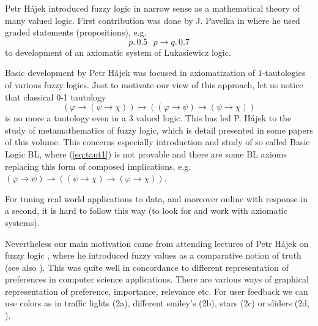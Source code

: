      Petr H\'{a}jek introduced fuzzy logic in narrow sense as a mathematical theory of many valued logic. First contribution was done by J. Pavelka in \cite{P} where he used graded statements (propositions), e.g.
\begin{displaymath}
p.\, 0.5\ \ \ p \rightarrow q.\, 0.7
\end{displaymath}
to development of an axiomatic system of Lukasiewicz logic. 
     
     Basic development by Petr H\'{a}jek \cite{Ha} was focused in axiomatization of 1-tautologies of various fuzzy logics. Just to motivate our view of this approach, let us notice that classical 0-1 tautology 
\begin{equation} \label{eq:taut1}
(\varphi\rightarrow(\psi\rightarrow\chi))\rightarrow((\varphi\rightarrow\psi)\rightarrow(\psi\rightarrow\chi))
\end{equation}
is no more a tautology even in a 3 valued logic. This has led P. H\'{a}jek to the study of metamathematics of fuzzy logic, which is detail presented in some papers of this volume. This concerns especially introduction and study of so called Basic Logic BL, where (\ref{eq:taut1}) is not provable and there are some BL axioms replacing this form of composed implications, e.g. 
\\$(\varphi\rightarrow\psi)\rightarrow((\psi\rightarrow\chi)\rightarrow(\varphi\rightarrow\chi))$.

     For tuning real world applications to data, and moreover online with response in a second, it is hard to follow this way (to look for and work with axiomatic systems). 

     Nevertheless our main motivation came from attending lectures of Petr H\'{a}jek on fuzzy logic \cite{HaTUW}, where he introduced fuzzy values as a comparative notion of truth (see also \cite{Ha2}). This was quite well in concordance to different representation of preferences in computer science applications. There are various ways of graphical representation of preference, importance, relevance etc. For user feedback we can use colors as in traffic lights (2a), different smiley's (2b), stars (2c) or sliders (2d, \cite{UPreA}).


